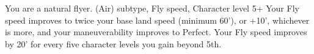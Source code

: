 \shortdescfeat
{You are a natural flyer.}
{(Air) subtype, Fly speed, Character level 5+}
{Your Fly speed improves to twice your base land speed (minimum 60'), or +10', whichever is more, and your maneuverability improves to Perfect.  Your Fly speed improves by 20' for every five character levels you gain beyond 5th.}



